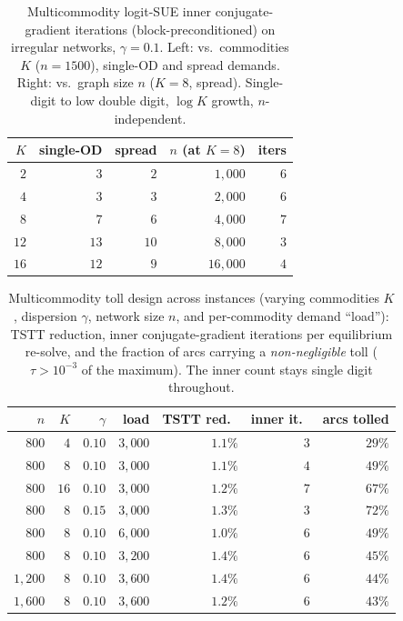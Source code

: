 \documentclass[ijoc]{informs3}
\begin{document}
\begin{table}[t]\centering
\caption{Multicommodity logit-SUE inner conjugate-gradient iterations (block-preconditioned) on irregular
networks, $\gamma=0.1$. Left: vs.\ commodities $K$ ($n=1500$), single-OD and spread demands. Right: vs.\ graph
size $n$ ($K=8$, spread). Single-digit to low double digit, $\log K$ growth, $n$-independent.}
\label{tab:mc}
\begin{tabular}{rrr@{\qquad}rr}\toprule
$K$ & single-OD & spread & $n$ (at $K{=}8$) & iters\\\midrule
$2$  & $3$  & $2$  & $1{,}000$ & $6$\\
$4$  & $3$  & $3$  & $2{,}000$ & $6$\\
$8$  & $7$  & $6$  & $4{,}000$ & $7$\\
$12$ & $13$ & $10$ & $8{,}000$ & $3$\\
$16$ & $12$ & $9$  & $16{,}000$ & $4$\\\bottomrule
\end{tabular}
\end{table}

\begin{table}[t]\centering
\caption{Multicommodity toll design across instances (varying commodities $K$, dispersion $\gamma$, network
size $n$, and per-commodity demand ``load''): TSTT reduction, inner conjugate-gradient iterations per
equilibrium re-solve, and the fraction of arcs carrying a \emph{non-negligible} toll ($\tau>10^{-3}$ of the
maximum). The inner count stays single digit throughout.}
\label{tab:mcdesign}
\begin{tabular}{rrrrrrr}\toprule
$n$ & $K$ & $\gamma$ & load & TSTT red.\ & inner it.\ & arcs tolled\\\midrule
$800$     & $4$  & $0.10$ & $3{,}000$ & $1.1\%$ & $3$ & $29\%$\\
$800$     & $8$  & $0.10$ & $3{,}000$ & $1.1\%$ & $4$ & $49\%$\\
$800$     & $16$ & $0.10$ & $3{,}000$ & $1.2\%$ & $7$ & $67\%$\\
$800$     & $8$  & $0.15$ & $3{,}000$ & $1.3\%$ & $3$ & $72\%$\\
$800$     & $8$  & $0.10$ & $6{,}000$ & $1.0\%$ & $6$ & $49\%$\\
$800$     & $8$  & $0.10$ & $3{,}200$ & $1.4\%$ & $6$ & $45\%$\\
$1{,}200$ & $8$  & $0.10$ & $3{,}600$ & $1.4\%$ & $6$ & $44\%$\\
$1{,}600$ & $8$  & $0.10$ & $3{,}600$ & $1.2\%$ & $6$ & $43\%$\\\bottomrule
\end{tabular}
\end{table}
\end{document}
